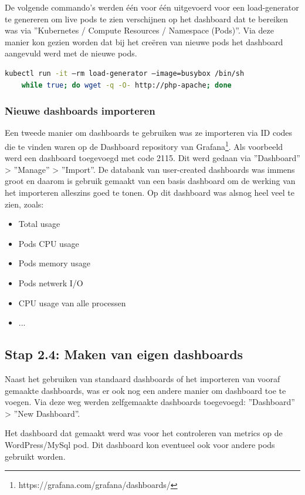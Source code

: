 De volgende commando's werden één voor één uitgevoerd voor een load-generator te genereren om live pods te zien verschijnen op het dashboard dat te bereiken was via ''Kubernetes / Compute Resources / Namespace (Pods)''. Via deze manier kon gezien worden dat bij het creëren van nieuwe pods het dashboard aangevuld werd met de nieuwe pods.

\begin{lstlisting}[language=bash,caption={load-generator}]
    kubectl run -it –rm load-generator –image=busybox /bin/sh 
    while true; do wget -q -O- http://php-apache; done
\end{lstlisting}

\subsubsection{Nieuwe dashboards importeren}

Een tweede manier om dashboards te gebruiken was ze importeren via ID codes die te vinden waren op de Dashboard repository van Grafana\footnote{https://grafana.com/grafana/dashboards/}. Als voorbeeld werd een dashboard toegevoegd met code 2115. Dit werd gedaan via ''Dashboard'' > ''Manage'' > ''Import''. De databank van user-created dashboards was immens groot en daarom is gebruik gemaakt van een basis dashboard om de werking van het importeren alleszins goed te tonen. Op dit dashboard was alsnog heel veel te zien, zoals:

\begin{itemize}
    \item Total usage
    \item Pods CPU usage
    \item Pods memory usage
    \item Pods netwerk I/O
    \item CPU usage van alle processen
    \item ...
\end{itemize}
\clearpage
\subsection{Stap 2.4: Maken van eigen dashboards}

Naast het gebruiken van standaard dashboards of het importeren van vooraf gemaakte dashboards, was er ook nog een andere manier om dashboard toe te voegen. Via deze weg werden zelfgemaakte dashboards toegevoegd: ''Dashboard'' > ''New Dashboard''.

Het dashboard dat gemaakt werd was voor het controleren van metrics op de WordPress/MySql pod. Dit dashboard kon eventueel ook voor andere pods gebruikt worden. 

